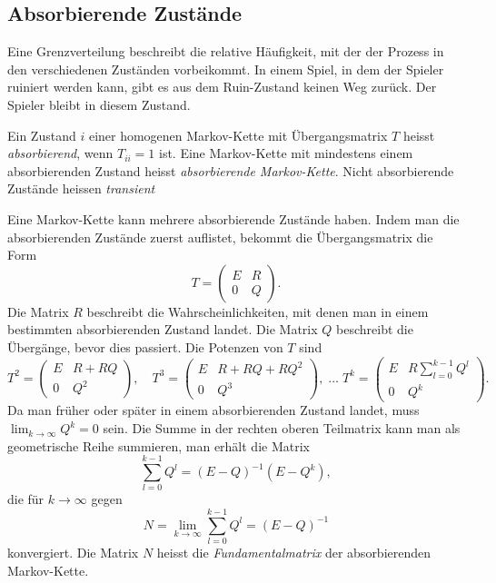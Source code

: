 \subsection{Absorbierende Zustände}
Eine Grenzverteilung beschreibt die relative Häufigkeit, mit der
der Prozess in den verschiedenen Zuständen vorbeikommt.
In einem Spiel, in dem der Spieler ruiniert werden kann, gibt es
aus dem Ruin-Zustand keinen Weg zurück.
Der Spieler bleibt in diesem Zustand.

\begin{definition}
Ein Zustand $i$ einer homogenen Markov-Kette mit Übergangsmatrix $T$
heisst {\em absorbierend}, wenn $T_{ii}=1$ ist.
%
Eine Markov-Kette mit mindestens einem absorbierenden Zustand heisst
{\em absorbierende Markov-Kette}.
%
Nicht absorbierende Zustände heissen {\em transient}
%
\end{definition}

Eine Markov-Kette kann mehrere absorbierende Zustände haben.
Indem man die absorbierenden Zustände zuerst auflistet, bekommt die 
Übergangsmatrix die Form
\[
T=
\left(
\begin{array}{c|c}
E&R\\
\hline
0&Q
\end{array}
\right).
\]
Die Matrix $R$ beschreibt die Wahrscheinlichkeiten, mit denen man
in einem bestimmten absorbierenden Zustand landet.
Die Matrix $Q$ beschreibt die Übergänge, bevor dies passiert.
Die Potenzen von $T$ sind
\[
T^2
=
\left(
\begin{array}{c|c}
E&R+RQ \\
\hline
0&Q^2
\end{array}
\right),
\quad
T^3
=
\left(
\begin{array}{c|c}
E&R+RQ+RQ^2 \\
\hline
0&Q^3
\end{array}
\right),
\;
\dots
\;
T^k
=
\left(
\begin{array}{c|c}
E&\displaystyle R\sum_{l=0}^{k-1} Q^l \\
\hline
0&Q^k
\end{array}
\right).
\]
Da man früher oder später in einem absorbierenden Zustand landet,
muss $\lim_{k\to\infty} Q^k=0$ sein.
Die Summe in der rechten oberen Teilmatrix kann man als geometrische
Reihe summieren, man erhält die Matrix
\[
\sum_{l=0}^{k-1} Q^l = (E-Q)^{-1}(E-Q^k),
\]
die für $k\to\infty$ gegen
\[
N
=
\lim_{k\to\infty} \sum_{l=0}^{k-1} Q^l
=
(E-Q)^{-1}
\]
konvergiert.
Die Matrix $N$ heisst die {\em Fundamentalmatrix} der absorbierenden
Markov-Kette.
%

